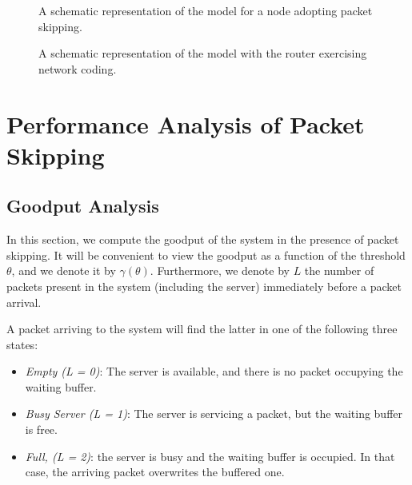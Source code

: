 \documentclass[preprint,12pt]{elsarticle}
\theoremstyle{definition}
\theoremstyle{plain}
\theoremstyle{remark}
\begin{document}
\begin{figure}[t]
\centering
{}
\caption{A schematic representation of the model for a node adopting packet skipping.}
\label{fig: model_sr}
\end{figure}

\begin{figure}[t]
\centering
{}
\caption{A schematic representation of the model with the router exercising network coding.}
\label{fig: model_nc}
\end{figure}



\section{Performance Analysis of Packet Skipping} \label{section:analysis-thresholding}

\subsection{Goodput Analysis}\label{section:renegingGoodputAnalysis}

In this section, we compute the goodput of the system in the presence of packet skipping. It will be convenient to view the goodput as a function of the threshold $\theta$, and we denote it by $\gamma(\theta)$. Furthermore, we denote by $L$ the number of packets present in the system (including the server) immediately before a packet arrival.

A packet arriving to the system will find the latter in one of the following three states:
\begin{itemize}
	\item \textit{Empty (L = 0)}: The server is available, and there is no packet occupying the waiting buffer.
	\item \textit{Busy Server (L = 1)}: The server is servicing a packet, but the waiting buffer is free.
	\item \textit{Full, (L = 2)}: the server is busy and the waiting buffer is occupied. In that case, the arriving packet overwrites the buffered one.
\end{itemize}
\end{document}
